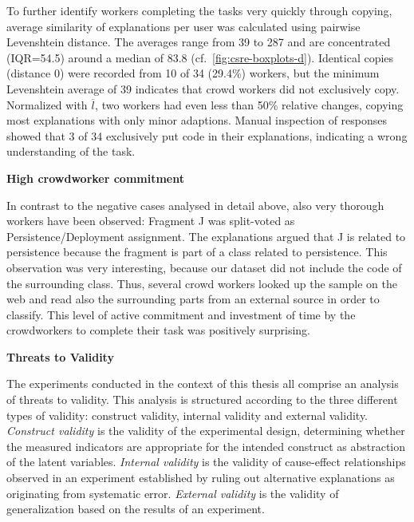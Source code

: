To further identify workers completing the tasks very quickly through copying, average similarity of explanations per user was calculated using pairwise Levenshtein distance.
The averages range from 39 to 287 and are concentrated (IQR=54.5) around a median of 83.8
(cf.~\cref{fig:csre-boxplots-d}).
Identical copies (distance 0) were recorded from 10 of 34 (29.4\%) workers, but the minimum Levenshtein average of 39 indicates that crowd workers did not exclusively copy.
Normalized with \(\overline l\), two workers had even less than 50\% relative changes, copying most explanations with only minor adaptions.
Manual inspection of responses showed that 3 of 34 exclusively put code in their explanations, indicating a wrong understanding of the task.

\textbf{High crowdworker commitment}

In contrast to the negative cases analysed in detail above, also very thorough workers have been observed: Fragment J was split-voted as Persistence/Deployment assignment.
The explanations argued that J is related to persistence because the fragment is part of a class related to persistence.
This observation was
very interesting, because our dataset did not include the code of the surrounding class.
Thus, several crowd workers looked up the sample on the web and read also the surrounding parts from an external source in order to classify.
This level of active commitment and investment of time by the crowdworkers
to complete their task was positively surprising.

\textbf{Threats to Validity}

The experiments conducted in the context of this thesis all comprise an analysis of threats to validity.
This analysis is structured according to the three different types of validity: construct validity, internal validity and external validity.
\emph{Construct validity} is the validity of the experimental design, determining whether the measured indicators are appropriate for the intended construct as abstraction of the latent variables.
\emph{Internal validity} is the validity of cause-effect relationships observed in an experiment established by ruling out alternative explanations as originating from systematic error.
\emph{External validity} is the validity of generalization based on the results of an experiment.
\autocite{Creswell2014ResearchDesign}

